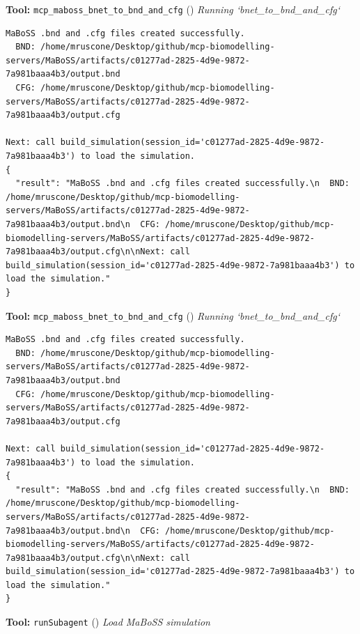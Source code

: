 \documentclass[11pt,a4paper]{article}
\begin{document}
\begin{toolokbox}
\textbf{Tool:} \texttt{mcp\_maboss\_bnet\_to\_bnd\_and\_cfg} (\checkmark)
\textit{Running `bnet\_to\_bnd\_and\_cfg`}
\begin{lstlisting}
MaBoSS .bnd and .cfg files created successfully.
  BND: /home/mruscone/Desktop/github/mcp-biomodelling-servers/MaBoSS/artifacts/c01277ad-2825-4d9e-9872-7a981baaa4b3/output.bnd
  CFG: /home/mruscone/Desktop/github/mcp-biomodelling-servers/MaBoSS/artifacts/c01277ad-2825-4d9e-9872-7a981baaa4b3/output.cfg

Next: call build_simulation(session_id='c01277ad-2825-4d9e-9872-7a981baaa4b3') to load the simulation.
{
  "result": "MaBoSS .bnd and .cfg files created successfully.\n  BND: /home/mruscone/Desktop/github/mcp-biomodelling-servers/MaBoSS/artifacts/c01277ad-2825-4d9e-9872-7a981baaa4b3/output.bnd\n  CFG: /home/mruscone/Desktop/github/mcp-biomodelling-servers/MaBoSS/artifacts/c01277ad-2825-4d9e-9872-7a981baaa4b3/output.cfg\n\nNext: call build_simulation(session_id='c01277ad-2825-4d9e-9872-7a981baaa4b3') to load the simulation."
}
\end{lstlisting}
\end{toolokbox}
\begin{toolokbox}
\textbf{Tool:} \texttt{mcp\_maboss\_bnet\_to\_bnd\_and\_cfg} (\checkmark)
\textit{Running `bnet\_to\_bnd\_and\_cfg`}
\begin{lstlisting}
MaBoSS .bnd and .cfg files created successfully.
  BND: /home/mruscone/Desktop/github/mcp-biomodelling-servers/MaBoSS/artifacts/c01277ad-2825-4d9e-9872-7a981baaa4b3/output.bnd
  CFG: /home/mruscone/Desktop/github/mcp-biomodelling-servers/MaBoSS/artifacts/c01277ad-2825-4d9e-9872-7a981baaa4b3/output.cfg

Next: call build_simulation(session_id='c01277ad-2825-4d9e-9872-7a981baaa4b3') to load the simulation.
{
  "result": "MaBoSS .bnd and .cfg files created successfully.\n  BND: /home/mruscone/Desktop/github/mcp-biomodelling-servers/MaBoSS/artifacts/c01277ad-2825-4d9e-9872-7a981baaa4b3/output.bnd\n  CFG: /home/mruscone/Desktop/github/mcp-biomodelling-servers/MaBoSS/artifacts/c01277ad-2825-4d9e-9872-7a981baaa4b3/output.cfg\n\nNext: call build_simulation(session_id='c01277ad-2825-4d9e-9872-7a981baaa4b3') to load the simulation."
}
\end{lstlisting}
\end{toolokbox}
\begin{toolokbox}
\textbf{Tool:} \texttt{runSubagent} (\checkmark)
\textit{Load MaBoSS simulation}
\end{toolokbox}
\end{document}
